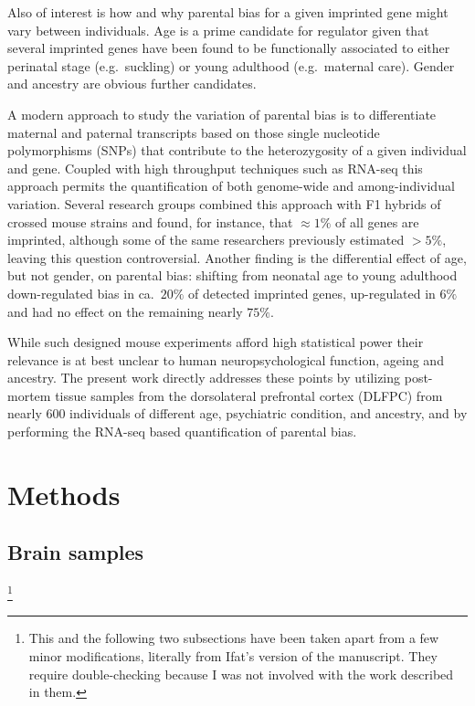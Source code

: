 \documentclass[letterpaper]{article}
\begin{document}
Also of interest is how and why parental bias for a given imprinted gene
might vary between individuals.  Age is a prime candidate for regulator
given that several imprinted genes have been found to be functionally associated to either
perinatal stage (e.g.~suckling) or young adulthood (e.g.~maternal care).
Gender and ancestry are obvious further candidates.

A modern approach to study the variation of parental bias is to differentiate
maternal and paternal transcripts based on those single nucleotide
polymorphisms (SNPs) that contribute to the heterozygosity of a given
individual and gene.  Coupled with high throughput techniques such as RNA-seq
this approach permits the quantification of both genome-wide and
among-individual variation.  Several research groups
\cite{Gregg2010a,Perez2015,DeVeale2012} combined this approach with F1 hybrids
of crossed mouse strains and found, for instance, that \(\approx 1\%\) of all
genes are imprinted, although some \cite{Perez2015} of the same researchers
previously estimated \(> 5\%\), leaving this question controversial.
Another finding is the differential effect of age, but not gender, on parental
bias: shifting from neonatal age to young adulthood down-regulated bias in
ca.~\(20\%\) of detected imprinted genes, up-regulated in \(6\%\) and had no
effect on the remaining nearly \(75\%\).

While such designed mouse experiments afford high statistical power their
relevance is at best unclear to human neuropsychological function, ageing and
ancestry.  The present work directly addresses these points by utilizing
post-mortem tissue samples from the dorsolateral prefrontal cortex (DLFPC)
from nearly 600 individuals of different age, psychiatric condition, and
ancestry, and by performing the RNA-seq based quantification of parental bias.

\section{Methods}

\subsection{Brain samples}

\footnote{This and the following two subsections
have been taken apart from a few minor modifications, literally from Ifat's
version of the manuscript.  They require double-checking because I was not
involved with the work described in them.}
\end{document}
